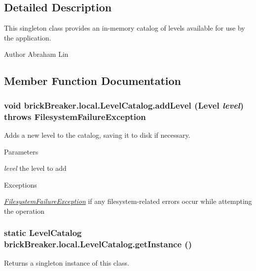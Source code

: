 \subsection{Detailed Description}
This singleton class provides an in-\/memory catalog of levels available for use by the application.

\begin{DoxyAuthor}{Author}
Abraham Lin 
\end{DoxyAuthor}


\subsection{Member Function Documentation}
\hypertarget{classbrick_breaker_1_1local_1_1_level_catalog_a81201df02f319ba10645c3ee711cb777}{
\subsubsection[{addLevel}]{\setlength{\rightskip}{0pt plus 5cm}void brickBreaker.local.LevelCatalog.addLevel ({\bf Level} {\em level})  throws {\bf FilesystemFailureException} }}
\label{classbrick_breaker_1_1local_1_1_level_catalog_a81201df02f319ba10645c3ee711cb777}
Adds a new level to the catalog, saving it to disk if necessary.


\begin{DoxyParams}{Parameters}
\item[{\em level}]the level to add\end{DoxyParams}

\begin{DoxyExceptions}{Exceptions}
\item[{\em \hyperlink{classbrick_breaker_1_1local_1_1_filesystem_failure_exception}{FilesystemFailureException}}]if any filesystem-\/related errors occur while attempting the operation \end{DoxyExceptions}
\hypertarget{classbrick_breaker_1_1local_1_1_level_catalog_abeb4b9d17e6743896f3f02eeaa571a42}{
\subsubsection[{getInstance}]{\setlength{\rightskip}{0pt plus 5cm}static {\bf LevelCatalog} brickBreaker.local.LevelCatalog.getInstance ()}}
\label{classbrick_breaker_1_1local_1_1_level_catalog_abeb4b9d17e6743896f3f02eeaa571a42}
Returns a singleton instance of this class.

